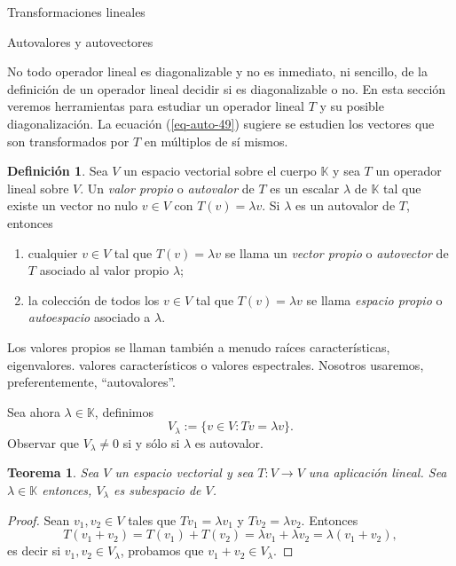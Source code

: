 \documentclass[a4paper,12pt,twoside,spanish,reqno]{amsbook}
\newtheorem{teorema}{Teorema}[section]
\theoremstyle{definition}
\newtheorem{definicion}{Definici\'on}[section]
\theoremstyle{remark}
\newcommand{\K}{\mathbb K}
\begin{document}
\begin{chapter}{Transformaciones lineales}
\begin{section}{Autovalores y autovectores}
        
        No todo operador lineal es diagonalizable y no es inmediato, ni sencillo, de la definición de un operador lineal decidir si es diagonalizable o no. En esta sección veremos herramientas para estudiar un operador lineal $T$ y su posible diagonalización. La ecuación (\ref{eq-auto-49}) sugiere se estudien los vectores que son transformados por $T$ en múltiplos de sí mismos.
        
        \begin{definicion}
            Sea $V$ un espacio vectorial sobre el cuerpo $\K$ y sea $T$ un operador lineal sobre $V$. Un \textit{valor propio} o \textit{autovalor} de $T$ es un escalar $\lambda$ de $\K$ tal que existe un vector no nulo $v \in V$ con $T(v) = \lambda v$. Si $\lambda$ es un autovalor de $T$, entonces
            \begin{enumerate}
                \item  cualquier  $v \in V$ tal que $T(v) = \lambda v$  se llama un \textit{vector propio} o  \textit{autovector} de $T$ asociado al valor propio $\lambda$;
                \item la colección de todos los $v \in V$ tal que $T(v) = \lambda v$  se llama \textit{espacio propio} o \textit{autoespacio} 	asociado a $\lambda$.
            \end{enumerate}
            
            Los valores propios se llaman también a menudo raíces características, eigenvalores. valores característicos o valores espectrales. Nosotros usaremos, preferentemente, ``autovalores''.
            
            Sea ahora $\lambda \in \K$, definimos
            $$
            V_\lambda := \{v \in V: Tv = \lambda v \}.
            $$
            Observar que $V_\lambda \ne 0$ si y sólo si $\lambda$ es autovalor. 
        \end{definicion}
        
        
        \begin{teorema}
            Sea $V$ un espacio vectorial y sea $T:V \to V$ una aplicación lineal. Sea $\lambda \in \K$ entonces, $V_\lambda$  es subespacio de $V$.
        \end{teorema}
        \begin{proof}
            Sean $v_1,v_2 \in V$ tales que $Tv_1 = \lambda v_1$ y $Tv_2 = \lambda v_2$. Entonces
            $$
            T(v_1+v_2) = T(v_1)+ T(v_2) = \lambda v_1 + \lambda v_2 = \lambda (v_1 + v_2),
            $$
            es decir si  $v_1,v_2 \in V_\lambda$, probamos que $v_1+v_2 \in V_\lambda$. 
            

\end{proof}
\end{section}
\end{chapter}
\end{document}
